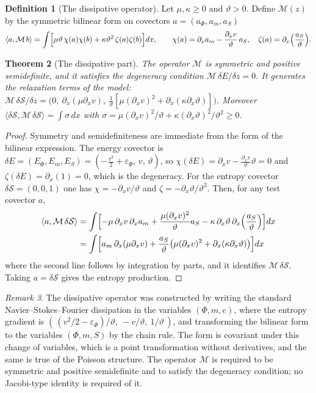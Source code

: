 \documentclass[11pt,oneside]{book}
\newtheorem{theorem}{Theorem}[chapter]
\theoremstyle{definition}
\newtheorem{definition}[theorem]{Definition}
\theoremstyle{remark}
\newtheorem{remark}[theorem]{Remark}
\newcommand{\mathscr}[1]{\mathcal{#1}}
\begin{document}
\begin{definition}[The dissipative operator]
Let $\mu,\kappa\geq0$ and $\vartheta>0$. Define $\mathcal M(z)$ by the symmetric bilinear form on covectors $a=(a_\Phi,a_m,a_S)$
\[
\langle a,\mathcal M\,b\rangle=\int\Bigl[\mu\vartheta\,\chi(a)\chi(b)+\kappa\vartheta^2\,\zeta(a)\zeta(b)\Bigr]dx,\qquad
\chi(a)=\partial_xa_m-\frac{\partial_xv}{\vartheta}\,a_S,\quad\zeta(a)=\partial_x\Bigl(\frac{a_S}{\vartheta}\Bigr).
\]
\end{definition}

\begin{theorem}[The dissipative part]\label{thm:M}
The operator $\mathcal M$ is symmetric and positive semidefinite, and it satisfies the degeneracy condition $\mathcal M\,\delta E/\delta z=0$. It generates the relaxation terms of the model: $\mathcal M\,\delta\mathscr S/\delta z=\bigl(0,\ \partial_x(\mu\partial_xv),\ \tfrac1\vartheta[\mu(\partial_xv)^2+\partial_x(\kappa\partial_x\vartheta)]\bigr)$. Moreover $\langle\delta\mathscr S,\mathcal M\,\delta\mathscr S\rangle=\int\sigma\,dx$ with $\sigma=\mu(\partial_xv)^2/\vartheta+\kappa(\partial_x\vartheta)^2/\vartheta^2\geq0$.
\end{theorem}

\begin{proof}
Symmetry and semidefiniteness are immediate from the form of the bilinear expression. The energy covector is $\delta E=(E_\Phi,E_m,E_S)=(-\tfrac{v^2}2+\varepsilon_\Phi,\,v,\,\vartheta)$, so $\chi(\delta E)=\partial_xv-\tfrac{\partial_xv}{\vartheta}\vartheta=0$ and $\zeta(\delta E)=\partial_x(1)=0$, which is the degeneracy. For the entropy covector $\delta\mathscr S=(0,0,1)$ one has $\chi=-\partial_xv/\vartheta$ and $\zeta=-\partial_x\vartheta/\vartheta^2$. Then, for any test covector $a$,
\[
\begin{aligned}
\langle a,\mathcal M\,\delta\mathscr S\rangle&=\int\Bigl[-\mu\,\partial_xv\,\partial_xa_m+\frac{\mu(\partial_xv)^2}{\vartheta}a_S-\kappa\,\partial_x\vartheta\,\partial_x\Bigl(\frac{a_S}\vartheta\Bigr)\Bigr]dx\\
&=\int\Bigl[a_m\,\partial_x(\mu\partial_xv)+\frac{a_S}\vartheta\bigl(\mu(\partial_xv)^2+\partial_x(\kappa\partial_x\vartheta)\bigr)\Bigr]dx
\end{aligned}\]
where the second line follows by integration by parts, and it identifies $\mathcal M\,\delta\mathscr S$. Taking $a=\delta\mathscr S$ gives the entropy production.
\end{proof}

\begin{remark}
The dissipative operator was constructed by writing the standard Navier--Stokes--Fourier dissipation in the variables $(\Phi,m,e)$, where the entropy gradient is $(\,(v^2/2-\varepsilon_\Phi)/\vartheta,\ -v/\vartheta,\ 1/\vartheta\,)$, and transforming the bilinear form to the variables $(\Phi,m,S)$ by the chain rule. The form is covariant under this change of variables, which is a point transformation without derivatives, and the same is true of the Poisson structure. The operator $\mathcal M$ is required to be symmetric and positive semidefinite and to satisfy the degeneracy condition; no Jacobi-type identity is required of it.
\end{remark}
\end{document}
